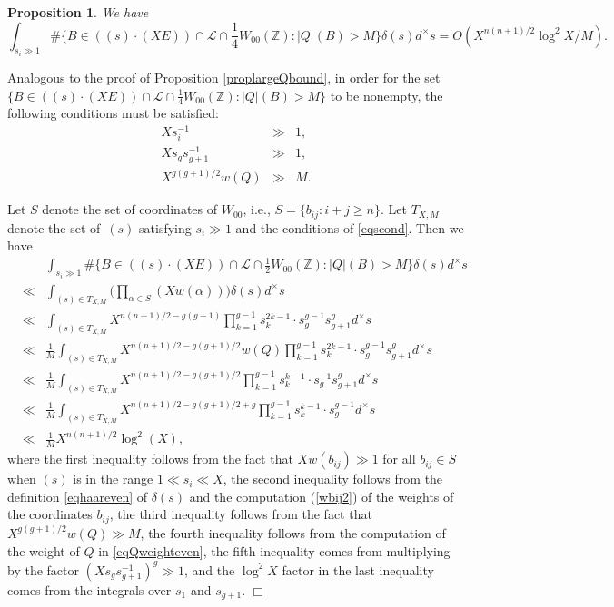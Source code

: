 \documentclass[11pt]{article}
\def\Z{{\mathbb Z}}
\def\Z{{\mathbb Z}}
\def\LL{{\mathcal L}}
\newtheorem{proposition}[theorem]{Proposition}
\newenvironment{proof}{\noindent {\bf Proof:}}{$\Box$ \vspace{2 ex}}
\begin{document}
\begin{proposition}\label{proplargeQboundeven}
We have
\begin{equation*}
\int_{s_i\gg 1} \#\{B\in ((s)\cdot(XE))\cap \LL\cap {\textstyle\frac14} W_{00}(\Z):|Q|(B)>M\}\delta(s)d^\times s=O(X^{n(n+1)/2}\log^2 X/M).
\end{equation*}
\end{proposition}
\begin{proof}
Analogous to the proof of
Proposition \ref{proplargeQbound}, in order for the set
$\{B\in((s)\cdot (XE))\cap \LL\cap \frac14 W_{00}(\Z):|Q|(B)>M\}$ to be nonempty,
the following conditions must be satisfied:
\begin{equation}\label{eqscond}
\begin{array}{rcl}
Xs_i^{-1}&\gg& 1,\\[.1in]
Xs_gs_{g+1}^{-1}&\gg& 1,\\[.1in]
X^{g(g+1)/2}w(Q)&\gg& M.
\end{array}
\end{equation}

Let $S$ denote the set of coordinates of $W_{00}$, i.e.,
$S=\{b_{ij}:i+j\geq n\}$. Let $T_{X,M}$ denote the set of~$(s)$
satisfying $s_i\gg 1$ and the conditions of \eqref{eqscond}. Then we have
\begin{eqnarray*}
&&\displaystyle\int_{s_i\gg 1} \#\{B\in((s)\cdot (XE))\cap \LL\cap {\textstyle\frac12} W_{00}(\Z):|Q|(B)>M\}\delta(s)d^\times s \\
&\ll&\displaystyle\int_{(s)\in T_{X,M}} \big(\prod_{\alpha\in S}(Xw(\alpha))\big)\delta(s)d^\times s \\
&\ll&\displaystyle\int_{(s)\in T_{X,M}} X^{n(n+1)/2-g(g+1)}\prod_{k=1}^{g-1}s_k^{2k-1}\cdot s_g^{g-1}s_{g+1}^{g}d^\times s \\
&\ll&\displaystyle\frac{1}{M}\int_{(s)\in T_{X,M}} X^{n(n+1)/2-g(g+1)/2}w(Q)\prod_{k=1}^{g-1}s_k^{2k-1}\cdot s_g^{g-1}s_{g+1}^{g}d^\times s \\
&\ll&\displaystyle\frac{1}{M}\int_{(s)\in T_{X,M}} X^{n(n+1)/2-g(g+1)/2}\prod_{k=1}^{g-1}s_k^{k-1}\cdot s_g^{-1}s_{g+1}^{g}d^\times s \\
&\ll&\displaystyle\frac{1}{M}\int_{(s)\in T_{X,M}} X^{n(n+1)/2-g(g+1)/2+g}\prod_{k=1}^{g-1}s_k^{k-1}\cdot s_g^{g-1}d^\times s \\
&\ll&\displaystyle\frac{1}{M}X^{n(n+1)/2}\log^2(X),
\end{eqnarray*}
where the first inequality follows from the fact that $Xw(b_{ij})\gg1$ for all $b_{ij}\in S$ when $(s)$ is in the range $1\ll s_i\ll X$, the second inequality follows from the definition \eqref{eqhaareven} of $\delta(s)$ and the computation (\ref{wbij2}) of the weights of the coordinates $b_{ij}$, the third inequality follows from the fact that $X^{g(g+1)/2}w(Q) \gg M$,
the fourth inequality follows from the computation of the weight
of $Q$ in \eqref{eqQweighteven}, the fifth inequality comes from multiplying by the factor $(Xs_gs_{g+1}^{-1})^g\gg1$, and  the $\log^2
X$ factor in the last inequality comes from the integrals over $s_1$ and $s_{g+1}$.
\end{proof}
\end{document}
